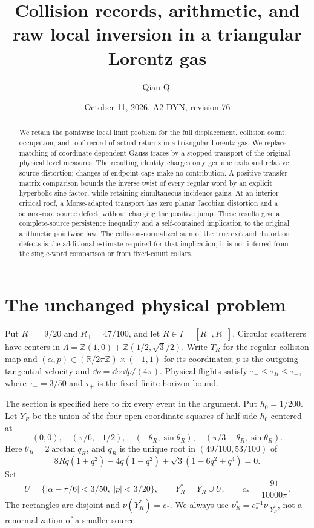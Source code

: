 \documentclass[11pt,reqno]{amsart}
\title[Collision records and raw local inversion]{Collision records, arithmetic, and raw local inversion in a triangular Lorentz gas}
\author{Qian Qi}
\date{October 11, 2026. A2-DYN, revision 76}
\numberwithin{equation}{section}
\theoremstyle{definition}
\theoremstyle{remark}\newtheorem{remark}[theorem]{Remark}
\newcommand{\R}{\mathbb R}\newcommand{\Z}{\mathbb Z}
\begin{document}
\raggedbottom
\begin{abstract}
We retain the pointwise local limit problem for the full displacement,
collision count, occupation, and roof record of actual returns in a
triangular Lorentz gas. We replace matching of coordinate-dependent
Gauss traces by a stopped transport of the original physical level
measures. The resulting identity charges only genuine exits and
relative source distortion; changes of endpoint caps make no
contribution. A positive transfer-matrix comparison bounds the inverse
twist of every regular word by an explicit hyperbolic-sine factor,
while retaining simultaneous incidence gains. At an interior critical
roof, a Morse-adapted transport has zero planar Jacobian distortion
and a square-root source defect, without charging the positive jump.
These results give a complete-source persistence inequality and a
self-contained implication to the original arithmetic pointwise law.
The collision-normalized sum of the true exit and distortion defects
is the additional estimate required for that implication; it is not
inferred from the single-word comparison or from fixed-count collars.
\end{abstract}
\maketitle

\section{The unchanged physical problem}
Put $R_-=9/20$ and $R_+=47/100$, and let $R\in I=[R_-,R_+]$. Circular scatterers have centers in
$\Lambda=\Z(1,0)+\Z(1/2,\sqrt3/2)$. Write $T_R$ for the regular
collision map and $(\alpha,p)\in(\R/2\pi\Z)\times(-1,1)$ for its
coordinates; $p$ is the outgoing tangential velocity and
$\dd\nu=\dd\alpha\,\dd p/(4\pi)$. Physical flights satisfy
$\tau_-\le\tau_R\le\tau_+$, where $\tau_-=3/50$ and $\tau_+$
is the fixed finite-horizon bound.

The section is specified here to fix every event in the argument.
Put $h_0=1/200$. Let $Y_R$ be the union of the four open coordinate
squares of half-side $h_0$ centered at
\[
 (0,0),\quad(\pi/6,-1/2),\quad
 (-\theta_R,\sin\theta_R),\quad
 (\pi/3-\theta_R,\sin\theta_R).
\]
Here $\theta_R=2\arctan q_R$, and $q_R$ is the unique root in
$(49/100,53/100)$ of
\[
 8Rq(1+q^2)-4q(1-q^2)+\sqrt3(1-6q^2+q^4)=0.
\]
Set
\[
 U=\{|\alpha-\pi/6|<3/50,\ |p|<3/20\},\qquad
 Y_R^*=Y_R\cup U,\qquad c_*=\frac{91}{10000\pi}.
\]
The rectangles are disjoint and $\nu(Y_R^*)=c_*$. We always use
$\nu_R^*=c_*^{-1}\nu|_{Y_R^*}$, not a renormalization of a smaller
source.
\end{document}
